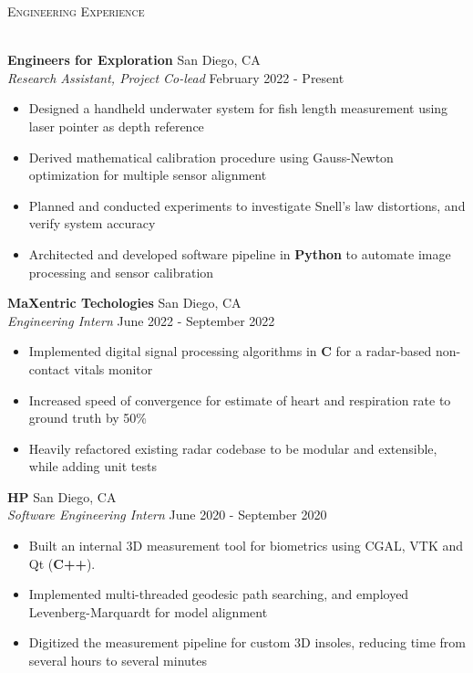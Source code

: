 \documentclass[a4paper]{article}
\newcommand{\lineunder} {
    \vspace*{-8pt} \\
    \hspace*{-18pt} \hrulefill \\
}
\newcommand{\header} [1] {
    {\hspace*{-18pt}\vspace*{6pt} \textsc{#1}}
    \vspace*{-6pt} \lineunder
}
\newenvironment{entry}[4][]{
  \textbf{#2} \hfill #1 \\
  \textit{#3} \hfill #4 \\
  \vspace{-2mm}
  \begin{itemize} \itemsep 0em
  }
  {
  \end{itemize}
}
\begin{document}
\header{Engineering Experience}
\vspace{1mm}


\begin{entry}[San Diego, CA]{Engineers for Exploration}{Research
    Assistant, Project Co-lead}{February 2022 - Present}
	\item Designed a handheld underwater system for fish length measurement using
    laser pointer as depth reference
  \item Derived mathematical calibration procedure using Gauss-Newton optimization
    for multiple sensor alignment
  \item Planned and conducted experiments to investigate Snell's law
    distortions, and verify system accuracy
	\item Architected and developed software pipeline in \textbf{Python} to automate image
    processing and sensor calibration
\end{entry}
\begin{entry}[San Diego, CA]{MaXentric Techologies}{Engineering Intern}{June
    2022 - September 2022}
	\item Implemented digital signal processing algorithms in \textbf{C} for a radar-based non-contact vitals monitor
  \item Increased speed of convergence for estimate of heart and respiration
    rate to ground truth by 50\%
	\item Heavily refactored existing radar codebase to be modular and
    extensible, while adding unit tests
\end{entry}

\begin{comment}
  \begin{entry}[San Diego, CA]{Amazon}{Software Development Engineering
      Intern}{June 2021 - September 2021}
  \item Designed and implemented a favorites list widget on the grocery cart page using \textbf{AWS} and \textbf{Spring}
	\item Performed cost/benefit analysis to identify appropriate \textbf{AWS} services (Lambda w/ Dynamo DB Table)
	\item Implemented new endpoints on micro-services used in production code to host front-end
\end{entry}
\end{comment}
\begin{entry}[San Diego, CA]{HP}{Software Engineering Intern}{June 2020 -
    September 2020}
\item Built an internal 3D measurement tool for biometrics using CGAL, VTK and Qt (\textbf{C++}).
\item Implemented multi-threaded geodesic path searching, and employed
  Levenberg-Marquardt for model alignment
\item Digitized the measurement pipeline for custom 3D insoles, reducing time from several hours to several minutes
\end{entry}
\end{document}
